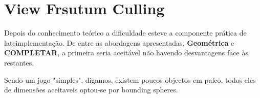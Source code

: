 \chapter{View Frsutum Culling}

Depois do conhecimento teórico a dificuldade esteve a componente prática de lateimplementação. De entre as abordagens apresentadas, {\bf Geométrica} e {\bf COMPLETAR}, a primeira seria aceitável não havendo desvantagens face às restantes.

Sendo um jogo "simples", digamos, existem poucos objectos em palco, todos eles de dimensões aceitaveis optou-se por bounding spheres.
